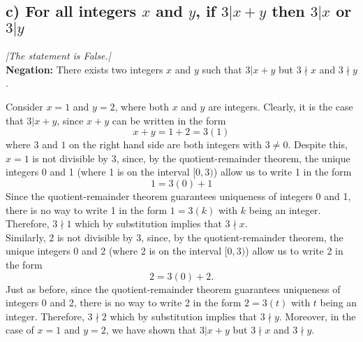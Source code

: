 \documentclass[11pt, letterpaper]{article}
\begin{document}
\subsection*{c) For all integers $x$ and $y$, if $3|x+y$ then $3|x$ or $3|y$}
{\large\it |The statement is False.|}\\[0.25cm]
{\bf Negation:} There exists two integers $x$ and $y$ such that $3|x+y$ but $3\nmid x$ and $3\nmid y$.
\begin{prf}
    Consider $x=1$ and $y=2$, where both $x$ and $y$ are integers.
    Clearly, it is the case that $3|x+y$, since $x+y$ can be written in the form
    \[x+y=1+2=3(1)\]
    where $3$ and $1$ on the right hand side are both integers with $3\neq 0$. Despite this, $x=1$ is not divisible
    by 3, since, by the quotient-remainder theorem, the unique integers 0 and 1 (where 1
    is on the interval $[0,3)$) allow us to write 1 in the form
    \[1=3(0)+1\]
    Since the quotient-remainder theorem guarantees uniqueness of integers 0 and 1, there is no way
    to write 1 in the form $1=3(k)$ with $k$ being an integer. Therefore, $3\nmid 1$ which by substitution implies that
    $3\nmid x$.\\[0.25cm]
    Similarly, 2 is not divisible by 3, since, by the quotient-remainder theorem, the unique integers 0 
    and 2 (where 2 is on the interval $[0,3)$) allow us to write 2 in the form
    \[2=3(0)+2\text{.}\]
    Just as before, since the quotient-remainder theorem guarantees uniqueness of integers 0 and 2, there is no way
    to write 2 in the form $2=3(t)$ with $t$ being an integer. Therefore, $3\nmid 2$ which by substitution implies that
    $3\nmid y$.\newline
    Moreover, in the case of $x=1$ and $y=2$, we have shown that $3|x+y$ but $3\nmid x$ and $3\nmid y$. 
\end{prf}
\end{document}
